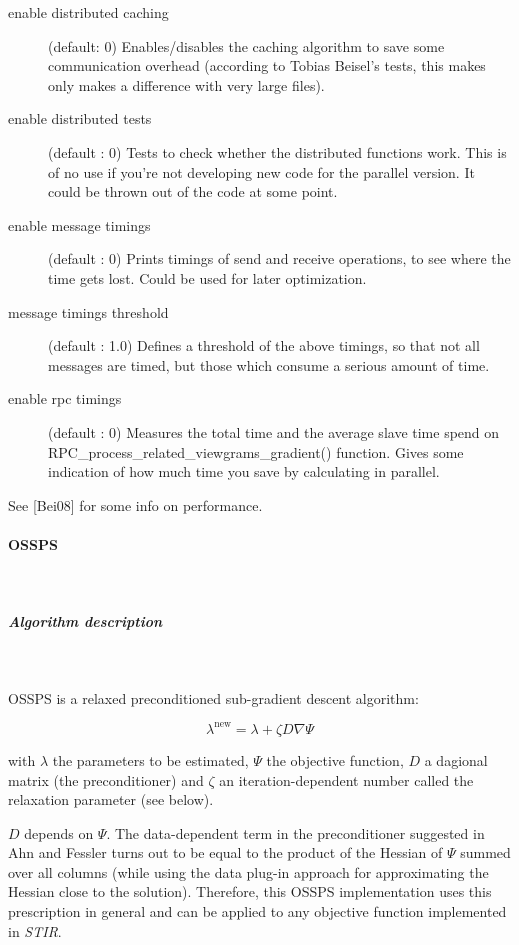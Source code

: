 \documentclass{article}
\newcommand{\subsubsubsection}[1]{\paragraph{#1}\mbox{} \\}
\newcommand{\subsubsubsubsection}[1]{\subparagraph{#1} \mbox{} \\}
\begin{document}
{\begin{description}
\item[enable distributed caching] (default: 0)
Enables/disables the caching algorithm to save some communication overhead (according
to Tobias Beisel's tests, this makes only makes a difference with very large files). 

\item[enable distributed tests] (default : 0)
Tests to check whether the distributed functions work. This is of no use if you're 
not developing new code for the parallel version. It could be thrown out of the code at some point.

\item[enable message timings] (default : 0)
Prints timings of send and receive operations, to see where the time gets lost. 
Could be used for later optimization. 

\item[message timings threshold] (default : 1.0)
Defines a threshold of the above timings, so that not all messages are timed, but those which 
consume a serious amount of time. 

\item[enable rpc timings] (default : 0)
Measures the total time and the average slave time spend on RPC\_process\_related\_viewgrams\_gradient() function. 
Gives some indication of how much time you save by calculating in parallel. 
\end{description}

See [Bei08] for some info on performance.

{ \subsubsubsection{OSSPS}
}
\label{sec:OSSPS}
  { \subsubsubsubsection{Algorithm description}
  }
  OSSPS is a relaxed preconditioned sub-gradient descent algorithm:

  \[ \lambda^\mathrm{new} = \lambda + \zeta D \nabla \Psi \]

  with $\lambda$ the parameters to be estimated,
  $\Psi$ the objective function,
  $D$ a dagional matrix (the preconditioner)
  and $\zeta$ an iteration-dependent number called the relaxation parameter (see below).

  $D$ depends on $\Psi$. The data-dependent term in the preconditioner 
  suggested in Ahn and Fessler turns out to be equal to the product of the Hessian of 
  $\Psi$ summed over all columns (while using the data plug-in approach for 
  approximating the Hessian close to the solution). Therefore, this OSSPS 
  implementation uses this prescription in general and can be applied to any objective
   function implemented in \textit{STIR}.  

}
\end{document}
